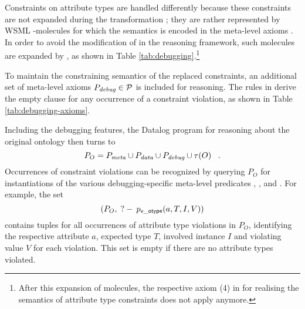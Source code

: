 Constraints on attribute types are handled differently because
these constraints are not expanded during the transformation
\transax ; they are rather represented by WSML
-molecules for which the semantics is encoded in the
meta-level axioms \mlaxioms. In order to avoid the modification of
\mlaxioms in the reasoning framework, such molecules are expanded
by \transdebug, as shown in Table
\ref{tab:debugging}.\footnote{After this expansion of
 molecules, the respective axiom (4) in \mlaxioms for
realising the semantics of attribute type constraints does not
apply anymore.}

\medskip

To maintain the constraining semantics of the replaced
constraints, an additional set of meta-level axioms $P_{\textit{\scriptsize{debug}}}
\in \mathcal{P}$ is included for reasoning. The rules in
\debugaxioms derive the empty clause for any occurrence of a
constraint violation, as shown in Table
\ref{tab:debugging-axioms}.

Including the debugging features, the Datalog program for
reasoning about the original ontology then turns to
\begin{displaymath}
    P_O = P_{\textit{\scriptsize{meta}}} \cup P_{\textit{\scriptsize{data}}} \cup P_{\textit{\scriptsize{debug}}} \cup \tau(O) \;\;\;.
\end{displaymath}
Occurrences of constraint violations can be recognized by querying
$P_O$ for instantiations of the various debugging-specific
meta-level predicates \pvotype, \pvmincard, \pvmaxcard and
\pvuser. For example, the set
\begin{displaymath}
    (P_O , \;?-\: p_{\mathrm{\sf v\_otype}}(a,T,I,V))
\end{displaymath}
contains tuples for all occurrences of attribute type violations
in $P_O$, identifying the respective attribute $a$, expected type
$T$, involved instance $I$ and violating value $V$ for each
violation. This set is empty if there are no attribute types
violated.

